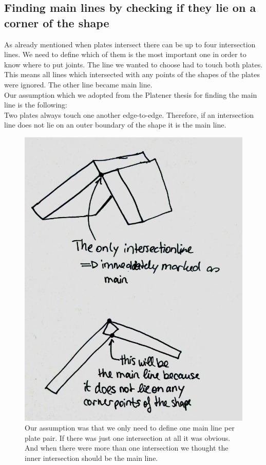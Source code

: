 \documentclass[../ClassicThesis.tex]{subfiles}
\begin{document}
\subsection{Finding main lines by checking if they lie on a corner of the shape}
As already mentioned when plates intersect there can be up to four intersection lines. We need to define which of them is the most important one in order to know where to put joints. The line we wanted to choose had to touch both plates.
This means all lines which intersected with any points of the shapes of the plates were ignored. The other line became main line.\\
Our assumption which we adopted from the Platener thesis   for finding the main line is the following:\\
Two plates always touch one another edge-to-edge. Therefore, if an intersection line does not lie on an outer boundary of the shape it is the main line.
\begin{figure}[!ht]
\centering
\includegraphics[width=.5\columnwidth]{Images/06-1-graph-assumptionMainLine.jpg}
\caption{Our assumption was that we only need to define one main line per plate pair. If there was just one intersection at all it was obvious. And when there were more than one intersection we thought the inner intersection should be the main line. }
\end{figure}
\end{document}
